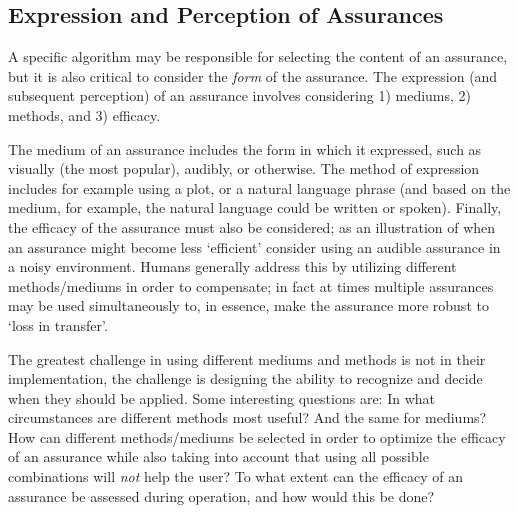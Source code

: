 \subsection{Expression and Perception of Assurances} \label{sec:express_assurances}
A specific algorithm may be responsible for selecting the content of an assurance, but it is also critical to consider the \emph{form} of the assurance. The expression (and subsequent perception) of an assurance involves considering 1) mediums, 2) methods, and 3) efficacy. 

The medium of an assurance includes the form in which it expressed, such as visually (the most popular), audibly, or otherwise. The method of expression includes for example using a plot, or a natural language phrase (and based on the medium, for example, the natural language could be written or spoken). Finally, the efficacy of the assurance must also be considered; as an illustration of when an assurance might become less `efficient' consider using an audible assurance in a noisy environment. Humans generally address this by utilizing different methods/mediums in order to compensate; in fact at times multiple assurances may be used simultaneously to, in essence, make the assurance more robust to `loss in transfer'.

The greatest challenge in using different mediums and methods is not in their implementation, the challenge is designing the ability to recognize and decide when they should be applied. Some interesting questions are: In what circumstances are different methods most useful? And the same for mediums? How can different methods/mediums be selected in order to optimize the efficacy of an assurance while also taking into account that using all possible combinations will \emph{not} help the user? To what extent can the efficacy of an assurance be assessed during operation, and how would this be done?
